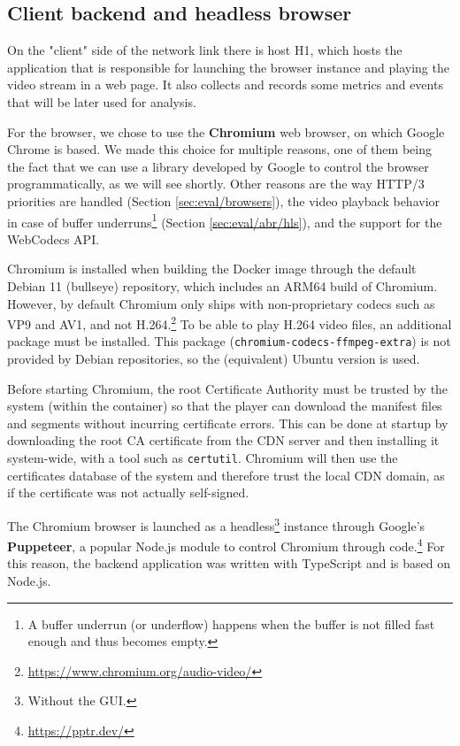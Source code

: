 \subsection{Client backend and headless browser}
\label{sec:eval/testbed/backend}

On the "client" side of the network link there is host H1, which hosts the application that is responsible for launching the browser instance and playing the video stream in a web page. It also collects and records some metrics and events that will be later used for analysis.

For the browser, we chose to use the \textbf{Chromium} web browser, on which Google Chrome is based. We made this choice for multiple reasons, one of them being the fact that we can use a library developed by Google to control the browser programmatically, as we will see shortly. Other reasons are the way HTTP/3 priorities are handled (Section \ref{sec:eval/browsers}), the video playback behavior in case of buffer underruns\footnote{A buffer underrun (or underflow) happens when the buffer is not filled fast enough and thus becomes empty.} (Section \ref{sec:eval/abr/hls}), and the support for the WebCodecs API.

Chromium is installed when building the Docker image through the default Debian 11 (bullseye) repository, which includes an ARM64 build of Chromium. However, by default Chromium only ships with non-proprietary codecs such as VP9 and AV1, and not H.264.\footnote{\url{https://www.chromium.org/audio-video/}} To be able to play H.264 video files, an additional package must be installed. This package (\texttt{chromium-codecs-ffmpeg-extra}) is not provided by Debian repositories, so the (equivalent) Ubuntu version is used.

Before starting Chromium, the root Certificate Authority must be trusted by the system (within the container) so that the player can download the manifest files and segments without incurring certificate errors. This can be done at startup by downloading the root CA certificate from the CDN server and then installing it system-wide, with a tool such as \texttt{certutil}. Chromium will then use the certificates database of the system and therefore trust the local CDN domain, as if the certificate was not actually self-signed.

The Chromium browser is launched as a headless\footnote{Without the GUI.} instance through Google's \textbf{Puppeteer}, a popular Node.js module to control Chromium through code.\footnote{\url{https://pptr.dev/}} For this reason, the backend application was written with TypeScript and is based on Node.js.

